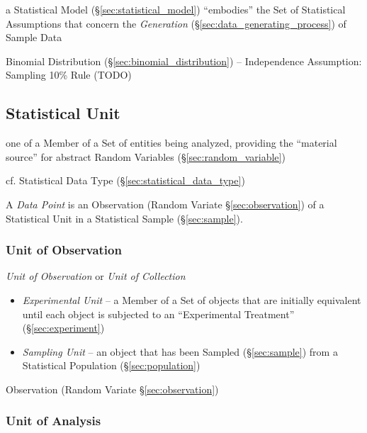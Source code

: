 \fist a Statistical Model (\S\ref{sec:statistical_model}) ``embodies'' the Set
of Statistical Assumptions that concern the \emph{Generation}
(\S\ref{sec:data_generating_process}) of Sample Data

Binomial Distribution (\S\ref{sec:binomial_distribution}) -- Independence
Assumption: Sampling 10\% Rule (TODO)



\subsection{Statistical Unit}\label{sec:statistical_unit}

one of a Member of a Set of entities being analyzed, providing the ``material
source'' for abstract Random Variables (\S\ref{sec:random_variable})

cf. Statistical Data Type (\S\ref{sec:statistical_data_type})

\fist A \emph{Data Point} is an Observation (Random Variate
\S\ref{sec:observation}) of a Statistical Unit in a Statistical Sample
(\S\ref{sec:sample}).



\subsubsection{Unit of Observation}\label{sec:observational_unit}

\emph{Unit of Observation} or \emph{Unit of Collection}

\begin{itemize}
  \item \emph{Experimental Unit} -- a Member of a Set of objects that are
    initially equivalent until each object is subjected to an ``Experimental
    Treatment'' (\S\ref{sec:experiment})
  \item \emph{Sampling Unit} -- an object that has been Sampled
    (\S\ref{sec:sample}) from a Statistical Population (\S\ref{sec:population})
\end{itemize}

\fist Observation (Random Variate \S\ref{sec:observation})



\subsubsection{Unit of Analysis}\label{sec:analysis_unit}

